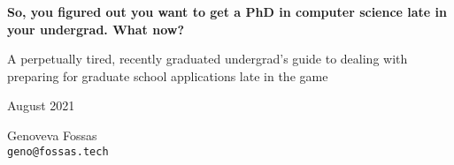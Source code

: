 \begin{titlepage}
    \begin{center}
        \vspace*{1cm}

        \Huge
        \textbf{So, you figured out you want to get a PhD in 
                computer science late in your undergrad. What now?}
 
        \large
        \vspace{0.5cm}

        A perpetually tired, recently graduated undergrad’s guide to dealing with preparing for graduate school applications late in the game

        \vspace{0.5cm}

        \normalsize

        August 2021
             
        \vspace{1.5cm}

        \vfill

        \small
        Genoveva Fossas \\
        \texttt{geno@fossas.tech}
             
    \end{center}
 \end{titlepage}